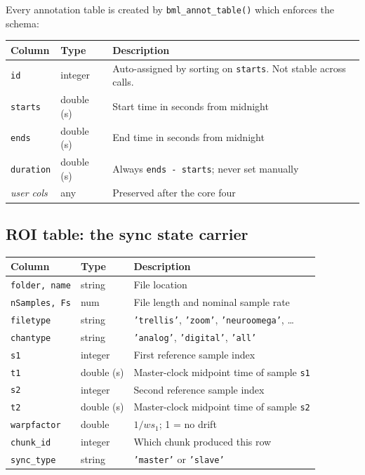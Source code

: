 \documentclass[11pt, a4paper]{article}
\begin{document}
Every annotation table is created by \texttt{bml\_annot\_table()} which enforces the schema:

\begin{center}
\begin{tabular}{L{2.4cm} L{1.8cm} L{9.3cm}}
\toprule
\textbf{Column} & \textbf{Type} & \textbf{Description} \\
\midrule
\texttt{id} & integer & Auto-assigned by sorting on \texttt{starts}. Not stable across calls. \\
\texttt{starts} & double (s) & Start time in seconds from midnight \\
\texttt{ends} & double (s) & End time in seconds from midnight \\
\texttt{duration} & double (s) & Always \texttt{ends - starts}; never set manually \\
\emph{user cols} & any & Preserved after the core four \\
\bottomrule
\end{tabular}
\end{center}

\subsection{ROI table: the sync state carrier}

\begin{center}
\begin{tabular}{L{2.4cm} L{1.8cm} L{9.3cm}}
\toprule
\textbf{Column} & \textbf{Type} & \textbf{Description} \\
\midrule
\texttt{folder, name} & string & File location \\
\texttt{nSamples, Fs} & num & File length and nominal sample rate \\
\texttt{filetype} & string & \texttt{'trellis'}, \texttt{'zoom'}, \texttt{'neuroomega'}, \ldots \\
\texttt{chantype} & string & \texttt{'analog'}, \texttt{'digital'}, \texttt{'all'} \\
\midrule
\texttt{s1} & integer & First reference sample index \\
\texttt{t1} & double (s) & Master-clock midpoint time of sample \texttt{s1} \\
\texttt{s2} & integer & Second reference sample index \\
\texttt{t2} & double (s) & Master-clock midpoint time of sample \texttt{s2} \\
\midrule
\texttt{warpfactor} & double & $1/ws_1$; 1 = no drift \\
\texttt{chunk\_id} & integer & Which chunk produced this row \\
\texttt{sync\_type} & string & \texttt{'master'} or \texttt{'slave'} \\
\bottomrule
\end{tabular}
\end{center}
\end{document}
